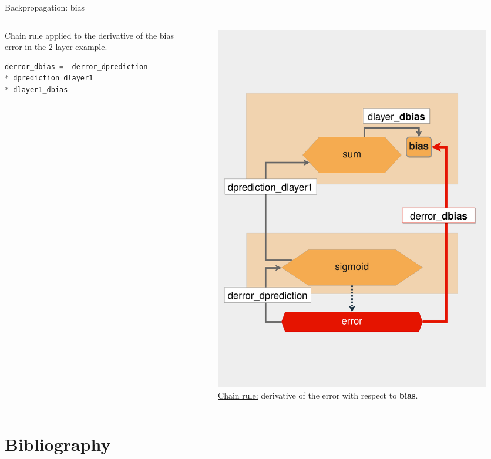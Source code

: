 \documentclass{beamer}
\begin{document}
\begin{frame}[fragile]{Backpropagation: bias}
    \begin{columns}
        \begin{column}{0.6\linewidth}  
            Chain rule applied to the derivative of the bias error in the 2 layer example.   
            \begin{lstlisting}[language=Python]
derror_dbias =  derror_dprediction 
* dprediction_dlayer1 
* dlayer1_dbias
            \end{lstlisting}
        \end{column}
        \begin{column}{0.4\linewidth}
            \begin{figure}
                \includegraphics[width=0.9\linewidth]{BiasGradient}
                \caption{\href{https://realpython.com/python-ai-neural-network/}{Chain rule:}  derivative of the error with respect to {\bf bias}.}
                \label{Fig:Training2Layer}
            \end{figure}
        \end{column}
     \end{columns}
\end{frame}

\section{Bibliography}


\end{document}

